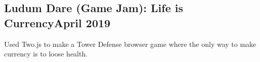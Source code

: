 \documentclass[../Resume.tex]{subfiles}
\begin{document}
	\subsection{Ludum Dare (Game Jam): Life is Currency\null\hfill April 2019}
	\par Used Two.js to make a Tower Defense browser game where the only way to make currency is to loose health.
	\vspace*{-2mm}
\end{document}
